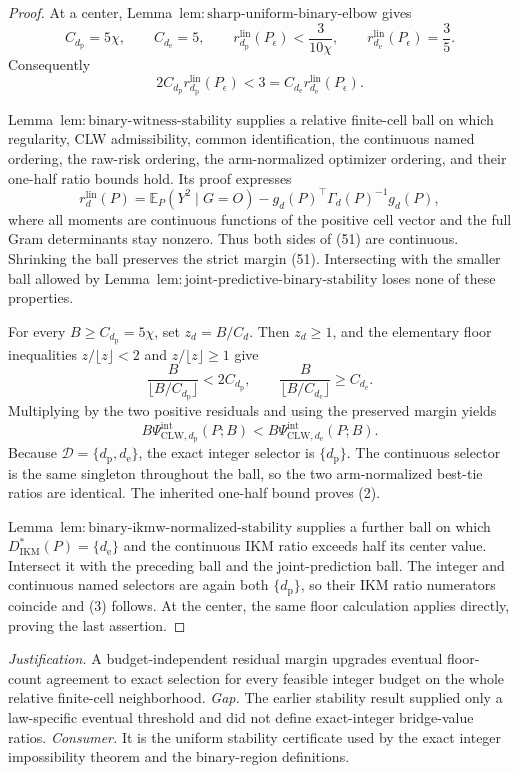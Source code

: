 \documentclass{article}
\begin{document}
\begin{proof}
At a center, Lemma~\(\mathrm{lem{:}sharp\text{-}uniform\text{-}binary\text{-}elbow}\) gives
\[
 C_{d_{\mathrm p}}=5\chi,
 \qquad C_{d_{\mathrm e}}=5,
 \qquad
 r_{d_{\mathrm p}}^{\mathrm{lin}}(P_\epsilon)<\frac3{10\chi},
 \qquad
 r_{d_{\mathrm e}}^{\mathrm{lin}}(P_\epsilon)=\frac35.
\]
Consequently
\[
 2C_{d_{\mathrm p}}r_{d_{\mathrm p}}^{\mathrm{lin}}(P_\epsilon)
 <3=C_{d_{\mathrm e}}r_{d_{\mathrm e}}^{\mathrm{lin}}(P_\epsilon). \tag{51}
\]

Lemma~\(\mathrm{lem{:}binary\text{-}witness\text{-}stability}\) supplies a relative finite-cell ball on which regularity, CLW admissibility, common identification, the continuous named ordering, the raw-risk ordering, the arm-normalized optimizer ordering, and their one-half ratio bounds hold.  Its proof expresses
\[
 r_d^{\mathrm{lin}}(P)=
 \mathbb E_P(Y^2\mid G=O)-g_d(P)^\top\Gamma_d(P)^{-1}g_d(P),
\]
where all moments are continuous functions of the positive cell vector and the full Gram determinants stay nonzero.  Thus both sides of (51) are continuous.  Shrinking the ball preserves the strict margin (51).  Intersecting with the smaller ball allowed by Lemma~\(\mathrm{lem{:}joint\text{-}predictive\text{-}binary\text{-}stability}\) loses none of these properties.

For every \(B\ge C_{d_{\mathrm p}}=5\chi\), set \(z_d=B/C_d\).  Then \(z_d\ge1\), and the elementary floor inequalities \(z/\lfloor z\rfloor<2\) and \(z/\lfloor z\rfloor\ge1\) give
\[
 \frac{B}{\lfloor B/C_{d_{\mathrm p}}\rfloor}<2C_{d_{\mathrm p}},
 \qquad
 \frac{B}{\lfloor B/C_{d_{\mathrm e}}\rfloor}\ge C_{d_{\mathrm e}}. \tag{52}
\]
Multiplying by the two positive residuals and using the preserved margin yields
\[
 B\Psi_{\mathrm{CLW},d_{\mathrm p}}^{\mathrm{int}}(P;B)
 <B\Psi_{\mathrm{CLW},d_{\mathrm e}}^{\mathrm{int}}(P;B).
\]
Because \(\mathcal D=\{d_{\mathrm p},d_{\mathrm e}\}\), the exact integer selector is \(\{d_{\mathrm p}\}\).  The continuous selector is the same singleton throughout the ball, so the two arm-normalized best-tie ratios are identical.  The inherited one-half bound proves (2).

Lemma~\(\mathrm{lem{:}binary\text{-}ikmw\text{-}normalized\text{-}stability}\) supplies a further ball on which \(D_{\mathrm{IKM}}^*(P)=\{d_{\mathrm e}\}\) and the continuous IKM ratio exceeds half its center value.  Intersect it with the preceding ball and the joint-prediction ball.  The integer and continuous named selectors are again both \(\{d_{\mathrm p}\}\), so their IKM ratio numerators coincide and (3) follows.  At the center, the same floor calculation applies directly, proving the last assertion.
\end{proof}
\par\smallskip\noindent \textit{Justification.} A budget-independent residual margin upgrades eventual floor-count agreement to exact selection for every feasible integer budget on the whole relative finite-cell neighborhood. \textit{Gap.} The earlier stability result supplied only a law-specific eventual threshold and did not define exact-integer bridge-value ratios. \textit{Consumer.} It is the uniform stability certificate used by the exact integer impossibility theorem and the binary-region definitions.
\end{document}
